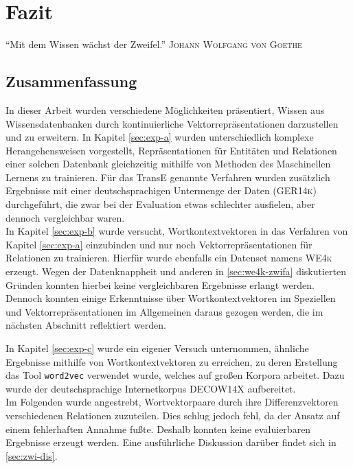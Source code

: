
\chapter{Fazit} %

\label{Chapter6} %


\begin{itquote}
  ``Mit dem Wissen wächst der Zweifel.''
  \flushright
  \textsc{Johann Wolfgang von Goethe}
\end{itquote}

\section{Zusammenfassung}

In dieser Arbeit wurden verschiedene Möglichkeiten präsentiert, Wissen aus Wissensdatenbanken durch kontinuierliche Vektorrepräsentationen
darzustellen und zu erweitern. In Kapitel \ref{sec:exp-a} wurden unterschiedlich komplexe Herangehensweisen vorgestellt, Repräsentationen
für Entitäten und Relationen einer solchen Datenbank gleichzeitig mithilfe von Methoden des Maschinellen Lernens zu trainieren.
Für das TransE genannte Verfahren wurden zusätzlich Ergebnisse mit einer deutschsprachigen Untermenge der Daten (\textsc{GER14k})
durchgeführt, die zwar bei der Evaluation etwas schlechter ausfielen, aber dennoch vergleichbar waren.\\

In Kapitel \ref{sec:exp-b} wurde versucht, Wortkontextvektoren in das Verfahren von Kapitel \ref{sec:exp-a} einzubinden und nur
noch Vektorrepräsentationen für Relationen zu trainieren. Hierfür wurde ebenfalls ein Datenset namens \textsc{WE4k}
erzeugt. Wegen der Datenknappheit und anderen in \ref{sec:we4k-zwifa} diskutierten Gründen konnten hierbei keine vergleichbaren Ergebnisse
erlangt werden. Dennoch konnten einige Erkenntnisse über Wortkontextvektoren im Speziellen und Vektorrepräsentationen
im Allgemeinen daraus gezogen werden, die im nächsten Abschnitt reflektiert werden.

In Kapitel \ref{sec:exp-c} wurde ein eigener Versuch unternommen, ähnliche Ergebnisse mithilfe von Wortkontextvektoren
zu erreichen, zu deren Erstellung das Tool \verb|word2vec| verwendet wurde, welches auf großen Korpora arbeitet. Dazu
wurde der deutschsprachige Internetkorpus \textsc{DECOW14X} aufbereitet.\\
Im Folgenden wurde angestrebt, Wortvektorpaare durch ihre Differenzvektoren verschiedenen Relationen zuzuteilen. Dies schlug
jedoch fehl, da der Ansatz auf einem fehlerhaften Annahme fußte. Deshalb konnten keine evaluierbaren Ergebnisse erzeugt werden.
Eine ausführliche Diskussion darüber findet sich in \ref{sec:zwi-dis}.\\

